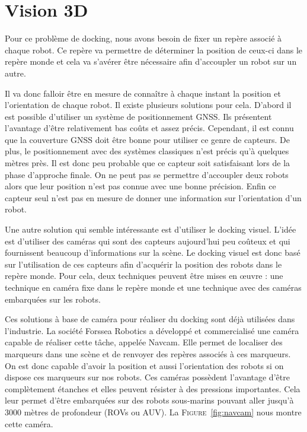 \section{Vision 3D}
    Pour ce problème de docking, nous avons besoin de fixer un repère associé à chaque robot. Ce repère va permettre de déterminer la position de ceux-ci dans le repère monde et cela va s’avérer être nécessaire afin d’accoupler un robot sur un autre.

    Il va donc falloir être en mesure de connaître à chaque instant la position et l’orientation de chaque robot. Il existe plusieurs solutions pour cela. D’abord il est possible d’utiliser un système de positionnement GNSS. Ils présentent l’avantage d’être relativement bas coûts et assez précis. Cependant, il est connu que la couverture GNSS doit être bonne pour utiliser ce genre de capteurs. De plus, le positionnement avec des systèmes classiques n’est précis qu’à quelques mètres près. Il est donc peu probable que ce capteur soit satisfaisant lors de la phase d’approche finale. On ne peut pas se permettre d’accoupler deux robots alors que leur position n’est pas connue avec une bonne précision. Enfin ce capteur seul n’est pas en mesure de donner une information sur l’orientation d’un robot.

    Une autre solution qui semble intéressante est d’utiliser le docking visuel. L’idée est d’utiliser des caméras qui sont des capteurs aujourd’hui peu coûteux et qui fournissent beaucoup d’informations sur la scène. Le docking visuel est donc basé sur l’utilisation de ces capteurs afin d’acquérir la position des robots dans le repère monde. Pour cela, deux techniques peuvent être mises en œuvre : une technique en caméra fixe dans le repère monde et une technique avec des caméras embarquées sur les robots.

    Ces solutions à base de caméra pour réaliser du docking sont déjà utilisées dans l’industrie. La société Forssea Robotics a développé et commercialisé une caméra capable de réaliser cette tâche, appelée Navcam. Elle permet de localiser des marqueurs dans une scène et de renvoyer des repères associés à ces marqueurs. On est donc capable d’avoir la position et aussi l’orientation des robots si on dispose ces marqueurs sur nos robots. Ces caméras possèdent l’avantage d’être complètement étanches et elles peuvent résister à des pressions importantes. Cela leur permet d’être embarquées sur des robots sous-marins pouvant aller jusqu’à 3000 mètres de profondeur (ROVs ou AUV). La \textsc{Figure}~\ref{fig:navcam} nous montre cette caméra.

